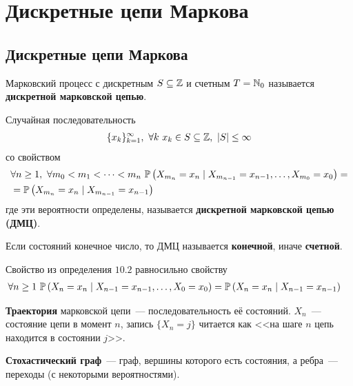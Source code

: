 \section{Дискретные цепи Маркова}
\subsection{Дискретные цепи Маркова}
\begin{Def}
    Марковский процесс с дискретным $S \subseteq \mathbb{Z}$ и счетным $T = \mathbb{N}_0$
    называется \textbf{дискретной марковской цепью}.
\end{Def}
\begin{Def}
    Случайная последовательность
    \begin{align*}
      \{x_k\}_{k=1}^\infty, \ \forall k \ x_k \in S \subseteq \ZZ, \ \left| S \right|\leq \infty
    \end{align*}
    со свойством
    \begin{align*}
      & \forall n \geq 1, \ \forall m_0 < m_1 < \dots < m_n \ \mathbb{P}\left( X_{m_n} = x_n \mid X_{m_{n-1}} = x_{n-1}, \dots, X_{m_0} = x_0 \right) = \\
      & = \mathbb{P}\left( X_{m_n} = x_n \mid X_{m_{n-1}} = x_{n-1}\right)
    \end{align*}
    где эти вероятности определены, называется \textbf{дискретной марковской
      цепью (ДМЦ)}.
\end{Def}
\begin{Def}
    Если состояний конечное число, то ДМЦ называется \textbf{конечной}, иначе \textbf{счетной}.
\end{Def}
\begin{Note}
    Свойство из определения $10.2$ равносильно свойству
    \begin{align*}
      & \forall n \geq 1 \ \mathbb{P}\left( X_{n} = x_n \mid X_{n-1} = x_{n-1}, \dots, X_{0} = x_0 \right) = \mathbb{P}\left( X_{n} = x_n \mid X_{n-1} = x_{n-1} \right)
    \end{align*}  
\end{Note}
\begin{Def}
    \textbf{Траектория} марковской цепи~--- последовательность её состояний.
    $X_n$~--- состояние цепи в момент $n$, запись $\{X_n = j\}$ читается как
    <<на шаге $n$ цепь находится в состоянии $j$>>.
\end{Def}
\begin{Def}
    \textbf{Стохастический граф}~--- граф, вершины которого есть состояния, а
    ребра~--- переходы (с некоторыми вероятностями).
\end{Def}
